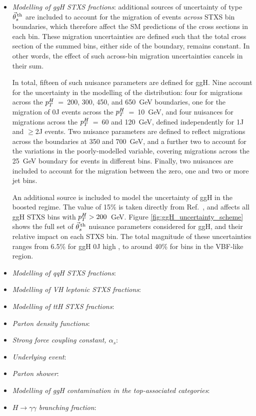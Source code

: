 \begin{itemize}
    \item \textit{Modelling of ggH STXS fractions}: additional sources of uncertainty of type $\vec{\theta}^{\,\rm{th}}_{s}$ are included to account for the migration of events \textit{across} STXS bin boundaries, which therefore affect the SM predictions of the cross sections in each bin. These migration uncertainties are defined such that the total cross section of the summed bins, either side of the boundary, remains constant. In other words, the effect of such across-bin migration uncertainties cancels in their sum.
    
    \noindent
    In total, fifteen of such nuisance parameters are defined for ggH. Nine account for the uncertainty in the modelling of the \ptH distribution: four for migrations across the $p_T^H$~=~200, 300, 450, and 650~GeV boundaries, one for the migration of 0J events across the $p_T^H$~=~10~GeV, and four nuisances for migrations across the $p_T^H$~=~60 and 120~GeV, defined independently for 1J and $\geq$2J events. Two nuisance parameters are defined to reflect migrations across the \mjj boundaries at 350 and 700~GeV, and a further two to account for the variations in the poorly-modelled \ptHjj variable, covering migrations across the 25~GeV boundary for events in different \mjj bins. Finally, two nuisances are included to account for the migration between the zero, one and two or more jet bins. 
    
    \noindent
    An additional source is included to model the uncertainty of ggH in the boosted regime. The value of 15\% is taken directly from Ref.~\cite{}, and affects all ggH STXS bins with $p_T^H>200$~GeV. Figure \ref{fig:ggH_uncertainty_scheme} shows the full set of $\vec{\theta}^{\,\rm{th}}_{s}$ nuisance parameters considered for ggH, and their relative impact on each STXS bin. The total magnitude of these uncertainties ranges from 6.5\% for ggH 0J high \ptH, to around 40\% for bins in the VBF-like region.
    
    \item \textit{Modelling of qqH STXS fractions}:
    
    \item \textit{Modelling of VH leptonic STXS fractions}:
    
    \item \textit{Modelling of ttH STXS fractions}:
    
    \item \textit{Parton density functions}:
    
    \item \textit{Strong force coupling constant, $\alpha_s$}:
    
    \item \textit{Underlying event}:
    
    \item \textit{Parton shower}:
    
    \item \textit{Modelling of ggH contamination in the top-associated categories}:
    
    \item \textit{$H\rightarrow\gamma\gamma$ branching fraction}:
\end{itemize}


